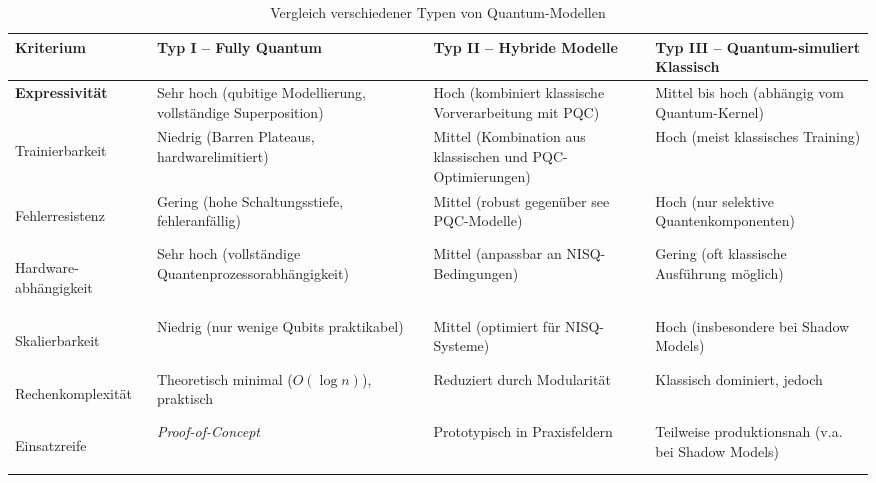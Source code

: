\begin{table}[ht]
\centering
\small
\begin{tabular}{|>{\bfseries}m{2.5cm}|m{3cm}|m{3cm}|m{3cm}|}
\hline
Kriterium & Typ I – \textbf{Fully Quantum} & Typ II – \textbf{Hybride Modelle} & Typ III – \textbf{Quantum-simuliert Klassisch} \\
\hline

Expressivität & Sehr hoch (qubitige Modellierung, vollständige Superposition) & Hoch (kombiniert klassische Vorverarbeitung mit PQC) & Mittel bis hoch (abhängig vom Quantum-Kernel) \\
\hline

Trainierbarkeit & Niedrig (Barren Plateaus, hardwarelimitiert) & Mittel (Kombination aus klassischen und PQC-Optimierungen) & Hoch (meist klassisches Training) \\
\hline

Fehlerresistenz & Gering (hohe Schaltungsstiefe, fehleranfällig) & Mittel (robust gegenüber see PQC-Modelle) & Hoch (nur selektive Quantenkomponenten) \\
\hline

Hardware-
abhängigkeit & Sehr hoch (vollständige Quantenprozessorabhängigkeit) & Mittel (anpassbar an NISQ-Bedingungen) & Gering (oft klassische Ausführung möglich) \\
\hline

Skalierbarkeit & Niedrig (nur wenige Qubits praktikabel) & Mittel (optimiert für NISQ-Systeme) & Hoch (insbesondere bei Shadow Models) \\
\hline

Rechenkomplexität & Theoretisch minimal ($O(\log n)$), praktisch & Reduziert durch Modularität & Klassisch dominiert, jedoch \\
\hline

Einsatzreife & \textit{Proof-of-Concept} & Prototypisch in Praxisfeldern & Teilweise produktionsnah (v.a. bei Shadow Models) \\
\hline
\end{tabular}
\caption{Vergleich verschiedener Typen von Quantum-Modellen}
\end{table}


